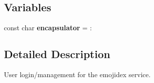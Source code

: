 \subsection*{Variables}
\begin{DoxyCompactItemize}
\item 
const char {\bfseries encapsulator} = \textquotesingle{}\+:\textquotesingle{}\hypertarget{namespaceEmojidex_ace247181eaac61ee1859c00da67746bc}{}\label{namespaceEmojidex_ace247181eaac61ee1859c00da67746bc}

\end{DoxyCompactItemize}


\subsection{Detailed Description}
User login/management for the emojidex service. 